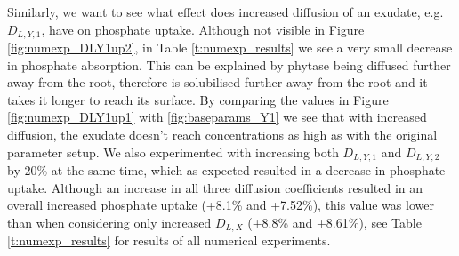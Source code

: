 \documentclass[11pt]{article}
\numberwithin{equation}{section}
\begin{document}
Similarly, we want to see what effect does increased diffusion of an exudate, e.g. $D_{L,Y,1}$, have on phosphate uptake. Although not visible in Figure \ref{fig:numexp_DLY1up2}, in Table \ref{t:numexp_results} we see a very small decrease in phosphate absorption. This can be explained by phytase being diffused further away from the root, therefore  is solubilised further away from the root and it takes it longer to reach its surface. By comparing the values in Figure \ref{fig:numexp_DLY1up1} with \ref{fig:baseparams_Y1} we see that with increased diffusion, the exudate doesn't reach concentrations as high as with the original parameter setup. We also experimented with increasing both $D_{L,Y,1}$ and $D_{L,Y,2}$ by 20\% at the same time, which as expected resulted in a decrease in phosphate uptake. Although an increase in all three diffusion coefficients resulted in an overall increased phosphate uptake (+8.1\% and +7.52\%), this value was lower than when considering only increased $D_{L,X}$ (+8.8\% and +8.61\%), see Table \ref{t:numexp_results} for results of all numerical experiments.
\end{document}
